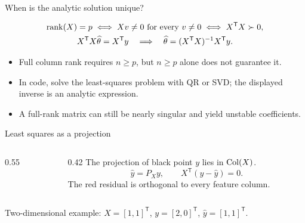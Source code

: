 \begin{frame}{When is the analytic solution unique?}
\begin{definitionbox}
\[
\begin{gathered}
\operatorname{rank}(X)=p
\iff Xv\ne0\ \text{for every }v\ne0
\iff X^{\mathsf T}X\succ0,\\
X^{\mathsf T}X\widehat\theta=X^{\mathsf T}y
\quad\Longrightarrow\quad
\widehat\theta=(X^{\mathsf T}X)^{-1}X^{\mathsf T}y.
\end{gathered}
\]
\end{definitionbox}
\small
\begin{itemize}\setlength{\itemsep}{9pt}
\item Full column rank requires $n\ge p$, but $n\ge p$ alone does not guarantee it.
\item In code, solve the least-squares problem with QR or SVD; the displayed inverse is an analytic expression.
\item A full-rank matrix can still be nearly singular and yield unstable coefficients.
\end{itemize}
\end{frame}

\begin{frame}{Least squares as a projection}
\begin{columns}[T,onlytextwidth]
\begin{column}{0.55\textwidth}\end{column}
\begin{column}{0.42\textwidth}\small
The projection of black point $y$ lies in $\operatorname{Col}(X)$.
\[
\widehat y=P_Xy,\qquad
X^{\mathsf T}(y-\widehat y)=0.
\]
The red residual is orthogonal to every feature column.
\end{column}\end{columns}
\vfill
\begin{takeaway}Two-dimensional example: $X=[1,1]^{\mathsf T}$, $y=[2,0]^{\mathsf T}$, $\widehat y=[1,1]^{\mathsf T}$.\end{takeaway}
\end{frame}


